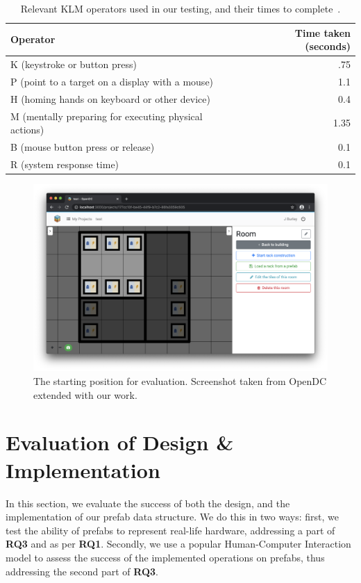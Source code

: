 \documentclass[11pt]{article}
\begin{document}
\newpage

\begin{table}[]
\centering
	\begin{tabular}{lr}
	\toprule
	Operator                                              & Time taken (seconds) \\ \midrule
	K (keystroke or button press)                         & .75                  \\
	P (point to a target on a display with a mouse)       & 1.1                  \\
	H (homing hands on keyboard or other device)          & 0.4                  \\
	M (mentally preparing for executing physical actions) & 1.35                 \\
	B (mouse button press or release)                     & 0.1                  \\
	R (system response time)							  &	   0.1                  \\
	\bottomrule
	\end{tabular}
\caption[Relevant KLM operators used in our testing, and their times to complete]{Relevant KLM operators used in our testing, and their times to complete~\cite{Newell1980}.}
\label{tab:3}
\end{table}


\begin{figure}[]
	\centering
	\includegraphics[width=\textwidth]{frontendstartingpoint.png}
	\caption[The starting position for evaluation]{The starting position for evaluation. Screenshot taken from OpenDC extended with our work.}
	\label{fig:evalstart}
\end{figure}

\section{Evaluation of Design \& Implementation} \label{sec:evaluation}
	In this section, we evaluate the success of both the design, and the implementation of our prefab data structure.
	We do this in two ways: first, we test the ability of prefabs to represent real-life hardware, addressing a part of \textbf{RQ3} and as per \textbf{RQ1}.
	Secondly, we use a popular Human-Computer Interaction model to assess the success of the implemented operations on prefabs, thus addressing the second part of \textbf{RQ3}.
\end{document}
